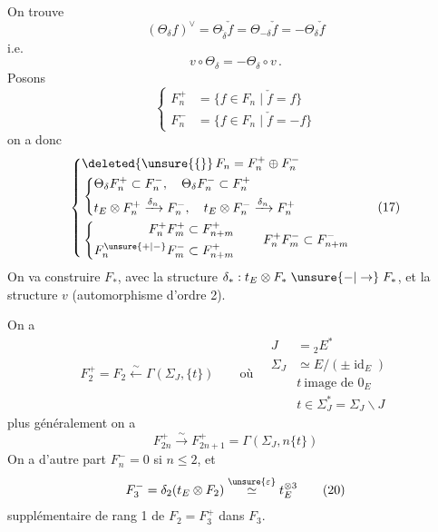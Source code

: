 On trouve
\[
 (\Theta_\delta f)^\vee=\Theta_{\check{\delta}}\check f
 =\Theta_{-\delta}\check f=-\Theta_\delta\check f \tag*{(15)}
\]
i.e.
\[
 v\circ\Theta_\delta=-\Theta_\delta\circ v\,.
\]
Posons
\[
 \left\{\begin{aligned}
 F_n^+&=\{f\in F_n\mid\check f=f\}\\
 F_n^-&=\{f\in F_n\mid\check f=-f\}
 \end{aligned}\right. \tag*{(16)}
\]
on a donc
\[
 \left\{\begin{aligned}
 &\deleted{\unsure{\{}}\,F_n=F_n^+\oplus F_n^-\\
 &\left\{\begin{aligned}
 &\Theta_\delta F_n^+\subset F_n^-,\quad \Theta_\delta F_n^-\subset F_n^+\\
 &t_E\otimes F_n^+\xrightarrow{\delta_n}F_n^-,\quad t_E\otimes F_n^-\xrightarrow{\delta_n}F_n^+
 \end{aligned}\right.\\
 &\left\{\begin{aligned}
 F_n^+F_m^+&\subset F_{n+m}^+\\
 F_n^{\unsure{+|-}}F_m^-&\subset F_{n+m}^+
 \end{aligned}\right.\qquad F_n^+F_m^-\subset F_{n+m}^-
 \end{aligned}\right. \tag*{(17)}
\]
On va construire  $F_*$, avec la structure $\delta_*:t_E\otimes F_*\mathrel{\unsure{-|\to}}F_*$,  et la structure $v$ (automorphisme d'ordre 2).

On a
\[
 F_2^+=F_2\xleftarrow{\sim}\Gamma(\Sigma_{J},\{t\})
 \qquad\text{où}\quad
 \begin{aligned}
 J&={}_2E^*\\
 \Sigma_J&\simeq E/(\pm\operatorname{id}_E)\\
 &t\ \text{image de }0_E\\
 &t\in\Sigma_J^*=\Sigma_J\smallsetminus J
 \end{aligned} \tag*{(18)}
\]
plus généralement on a
\[
 F_{2n}^+\xrightarrow{\sim}F_{2n+1}^+=\Gamma(\Sigma_{J},n\{t\}) \tag*{(19)}
\]
On a d'autre part $F_n^-=0$ si $n\leq 2$, et
\[
 F_3^-=\delta_2(t_E\otimes F_2)\overset{\unsure{\varepsilon}}{\simeq}t_E^{\otimes3} \tag*{(20)}
\]
supplémentaire de rang 1 de $F_2=F_3^+$ dans $F_3$.

